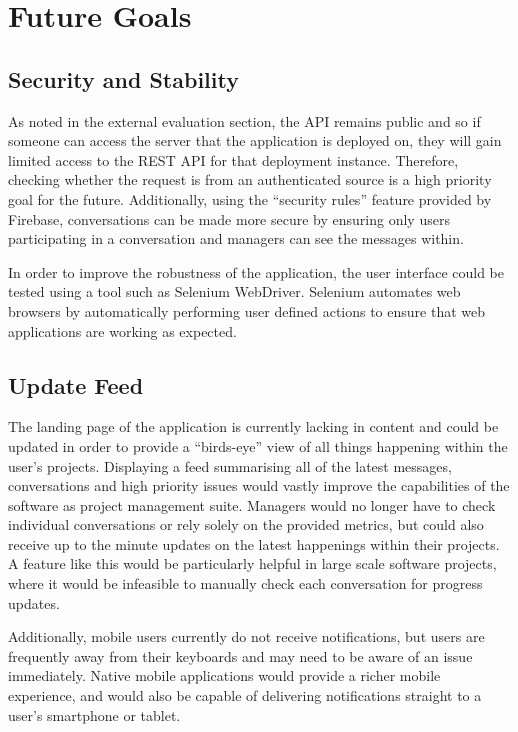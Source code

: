 \documentclass[a4paper]{l3proj}
\begin{document}
\section{Future Goals}
\label{futureGoals}

\subsection{Security and Stability}
\label{security}
As noted in the external evaluation section, the API remains public and so if someone can access the server that the application is deployed on, they will gain limited access to the REST API for that deployment instance. Therefore, checking whether the request is from an authenticated source is a high priority goal for the future. Additionally, using the “security rules” feature provided by Firebase, conversations can be made more secure by ensuring only users participating in a conversation and managers can see the messages within.

In order to improve the robustness of the application, the user interface could be tested using a tool such as Selenium WebDriver. Selenium \cite{site:selenium} automates web browsers by automatically performing user defined actions to ensure that web applications are working as expected.

\subsection{Update Feed}
\label{updating}
The landing page of the application is currently lacking in content and could be updated in order to provide a “birds-eye” view of all things happening within the user’s projects. Displaying a feed summarising all of the latest messages, conversations and high priority issues would vastly improve the capabilities of the software as project management suite. Managers would no longer have to check individual conversations or rely solely on the provided metrics, but could also receive up to the minute updates on the latest happenings within their projects. A feature like this would be particularly helpful in large scale software projects, where it would be infeasible to manually check each conversation for progress updates.

Additionally, mobile users currently do not receive notifications, but users are frequently away from their keyboards and may need to be aware of an issue immediately. Native mobile applications would provide a richer mobile experience, and would also be capable of delivering notifications straight to a user’s smartphone or tablet. 
\end{document}
